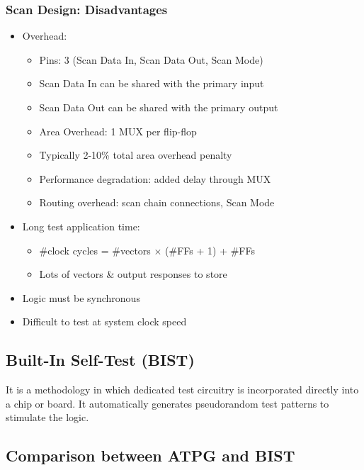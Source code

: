 \documentclass[12pt, a4paper]{article}
\begin{document}
\subsubsection*{Scan Design: Disadvantages}
\begin{itemize}
    \item Overhead:
    \begin{itemize}
        \item Pins: 3 (Scan Data In, Scan Data Out, Scan Mode)
        \item Scan Data In can be shared with the primary input
        \item Scan Data Out can be shared with the primary output
        \item Area Overhead: 1 MUX per flip-flop
        \item Typically 2-10\% total area overhead penalty
        \item Performance degradation: added delay through MUX
        \item Routing overhead: scan chain connections, Scan Mode
    \end{itemize}
    \item Long test application time:
    \begin{itemize}
        \item \#clock cycles = \#vectors $\times$ (\#FFs + 1) + \#FFs
        \item Lots of vectors \& output responses to store
    \end{itemize}
    \item Logic must be synchronous
    \item Difficult to test at system clock speed
\end{itemize}

\subsection{Built-In Self-Test (BIST)}
It is a methodology in which dedicated test circuitry is incorporated directly into a chip or board. It automatically generates pseudorandom test patterns to stimulate the logic.

\subsection{Comparison between ATPG and BIST}
\end{document}

